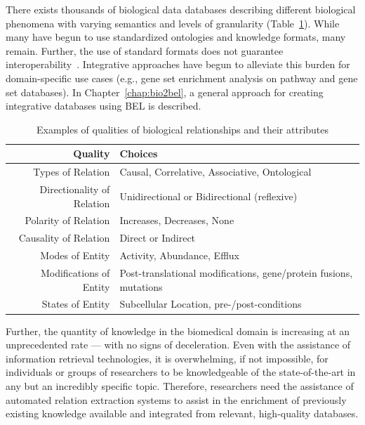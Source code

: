 There exists thousands of biological data databases describing different biological phenomena with varying semantics and levels of granularity (Table~\ref{table:biological_relations}).
While many have begun to use standardized ontologies and knowledge formats, many remain.
Further, the use of standard formats does not guarantee interoperability~\cite{Domingo-Fernandez2019a}.
Integrative approaches have begun to alleviate this burden for domain-specific use cases (e.g., gene set enrichment analysis on pathway and gene set databases).
In Chapter~\autoref{chap:bio2bel}, a general approach for creating integrative databases using BEL is described.

\begin{table}
    \centering
    \begin{tabular}{ r l }
        Quality & Choices \\
        \hline
        Types of Relation & Causal, Correlative, Associative, Ontological \\
        Directionality of Relation & Unidirectional or Bidirectional (reflexive) \\
        Polarity of Relation & Increases, Decreases, None \\
        Causality of Relation & Direct or Indirect \\
        Modes of Entity & Activity, Abundance, Efflux  \\
        Modifications of Entity & Post-translational modifications, gene/protein fusions, mutations \\
        States of Entity & Subcellular Location, pre-/post-conditions \\

    \end{tabular}
    \caption{Examples of qualities of biological relationships and their attributes}
    \label{table:biological_relations}
\end{table}

Further, the quantity of knowledge in the biomedical domain is increasing at an unprecedented rate — with no signs of deceleration.
Even with the assistance of information retrieval technologies, it is overwhelming, if not impossible, for individuals or groups of researchers to be knowledgeable of the state-of-the-art in any but an incredibly specific topic.
Therefore, researchers need the assistance of automated relation extraction systems to assist in the enrichment of previously existing knowledge available and integrated from relevant, high-quality databases.


